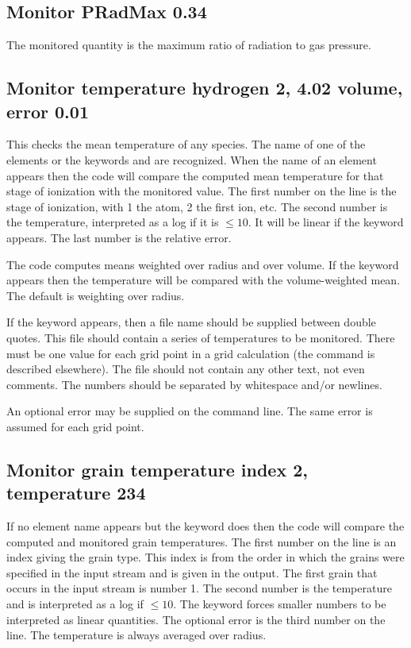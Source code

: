 \subsection{Monitor PRadMax 0.34}

The monitored quantity is the maximum ratio of radiation to gas pressure.

\subsection{Monitor temperature hydrogen 2, 4.02 volume, error 0.01}

This checks the mean temperature of any species.
The name of one of
the elements or the keywords  and  are recognized.
When the name
of an element appears then the code will compare the computed mean
temperature for that stage of ionization with the monitored value.
The first
number on the line is the stage of ionization, with 1 the atom,
2 the first ion, etc.
The second number is the temperature, interpreted as a log if
it is $\le 10$.
It will be linear if the keyword  appears.
The last number
is the relative error.

The code computes means weighted over radius and over volume.
If the
keyword  appears then the temperature will
be compared with the
volume-weighted mean.
The default is weighting over radius.

If the keyword  appears, then a file name should be supplied
between double quotes. This file should contain a series of temperatures to be
monitored. There must be one value for each grid point in a grid calculation
(the  command is described elsewhere). The file should not contain
any other text, not even comments. The numbers should be separated by whitespace
and/or newlines.

An optional error may be supplied on the command line. The same error is
assumed for each grid point.

\subsection{Monitor grain temperature index 2, temperature  234}

If no element name appears but the keyword 
does then the code
will compare the computed and monitored grain temperatures.
The first number
on the line is an index giving the grain type.
This index is from the order
in which the grains were specified in the input stream and
is given in the output.
The first grain that occurs in the input stream is number 1.
The
second number is the temperature and is interpreted as a
log if $\le 10$.
The
 keyword forces smaller numbers to be
interpreted as linear quantities.
The optional error is the third number on the line.
The temperature is
always averaged over radius.

